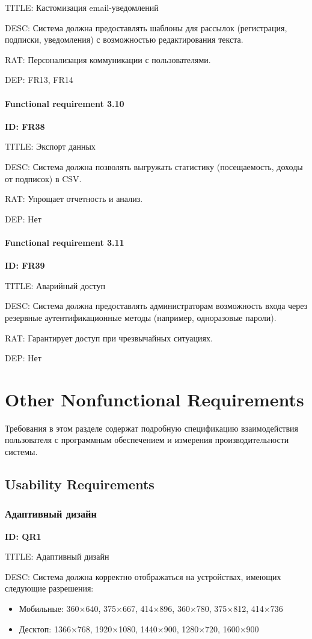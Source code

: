 \documentclass{scrreprt}
\begin{document}
TITLE: Кастомизация email-уведомлений

DESC: Система должна предоставлять шаблоны для рассылок (регистрация, подписки, уведомления) с возможностью редактирования текста.

RAT: Персонализация коммуникации с пользователями.

DEP: FR13, FR14
\subsubsection{Functional requirement 3.10}
\textbf{ID: FR38}

TITLE: Экспорт данных

DESC: Система должна позволять выгружать статистику (посещаемость, доходы от подписок) в CSV.

RAT: Упрощает отчетность и анализ.

DEP: Нет
\subsubsection{Functional requirement 3.11}
\textbf{ID: FR39}

TITLE: Аварийный доступ

DESC: Система должна предоставлять администраторам возможность входа через резервные аутентификационные методы (например, одноразовые пароли).

RAT: Гарантирует доступ при чрезвычайных ситуациях.

DEP: Нет

\chapter{Other Nonfunctional Requirements}
Требования в этом разделе содержат подробную спецификацию взаимодействия пользователя с программным обеспечением и измерения производительности системы.
\section{Usability Requirements}
\subsection{Адаптивный дизайн}
\textbf{ID: QR1}

TITLE: Адаптивный дизайн

DESC:
Система должна корректно отображаться на устройствах, имеющих следующие разрешения:
\begin{itemize}
\item Мобильные: 360×640, 375×667, 414×896, 360×780, 375×812, 414×736

\item Десктоп: 1366×768, 1920×1080, 1440×900, 1280×720, 1600×900
\end{itemize}
\end{document}
